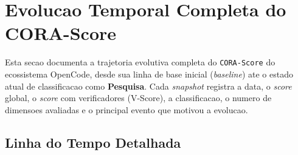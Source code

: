 \section{Evolucao Temporal Completa do CORA-Score}

Esta secao documenta a trajetoria evolutiva completa do \texttt{CORA-Score} do ecossistema OpenCode, desde sua linha de base inicial (\textit{baseline}) ate o estado atual de classificacao como \textbf{Pesquisa}. Cada \textit{snapshot} registra a data, o \textit{score} global, o \textit{score} com verificadores (V-Score), a classificacao, o numero de dimensoes avaliadas e o principal evento que motivou a evolucao.

\subsection{Linha do Tempo Detalhada}

